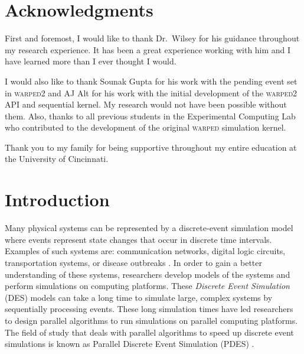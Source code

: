 \documentclass[11pt]{book}
\begin{document}


\chapter*{Acknowledgments}

First and foremost, I would like to thank Dr.\ Wilsey for his guidance throughout my research
experience. It has been a great experience working with him and I have learned more than I ever
thought I would.

I would also like to thank Sounak Gupta for his work with the pending event set in \textsc{warped2}
and AJ Alt for his work with the initial development of the \textsc{warped2} API and sequential
kernel.  My research would not have been possible without them.  Also, thanks to all previous
students in the Experimental Computing Lab who contributed to the development of the original
\textsc{warped} simulation kernel.

Thank you to my family for being supportive throughout my entire education at the
University of Cincinnati.

\tableofcontents    \markright{ }
\listoffigures      \markright{ }
\listoftables       \markright{ }
\listofalgorithms   \markright{ }
\lstlistoflistings  \markright{ }

\clearpage
{} \setcounter{page}{1}

\chapter{Introduction}\label{intro}

Many physical systems can be represented by a discrete-event simulation model where events represent
state changes that occur in discrete time intervals.  Examples of such systems are: communication
networks, digital logic circuits, transportation systems, or disease outbreaks \cite{law-00}.  In
order to gain a better understanding of these systems, researchers develop models of the systems and
perform simulations on computing platforms.  These \emph{Discrete Event Simulation} (DES) models can
take a long time to simulate large, complex systems by sequentially processing events.  These long
simulation times have led researchers to design parallel algorithms to run simulations on parallel
computing platforms.  The field of study that deals with parallel algorithms to speed up discrete
event simulations is known as Parallel Discrete Event Simulation (PDES)
\cite{fujimoto-90,fujimoto-00}.
\end{document}
